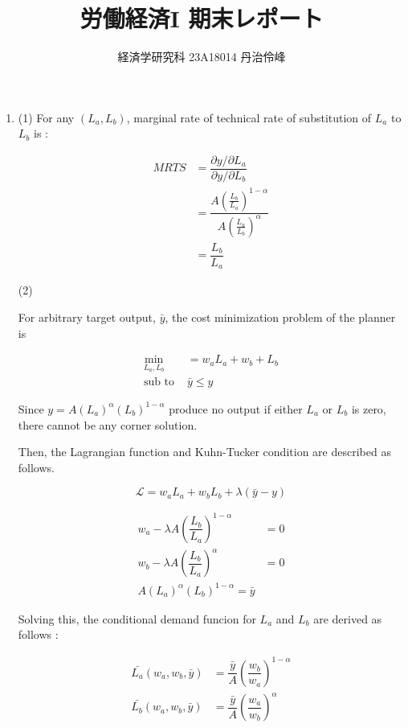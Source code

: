 \documentclass{jsarticle}
\begin{document}
\title{労働経済I 期末レポート}
\author{経済学研究科 23A18014 丹治伶峰}
\date{}
\maketitle

\large

 \begin{enumerate}
 
 \item
 
 (1)
  For any $(L_a, L_b)$, marginal rate of technical rate of substitution of $L_a$ to $L_b$ is :
 
  \begin{align*}
  \textit{MRTS} &= \dfrac{\partial y / \partial L_a}{\partial y / \partial L_b} \\
  &= \dfrac{A (\frac{L_b}{L_a})^{1-\alpha}}{A (\frac{L_a}{L_b})^\alpha} \\
  &= \dfrac{L_b}{L_a}
  \end{align*}
 
 (2)
 
 For arbitrary target output, $\bar{y}$, the cost minimization problem of the planner is
 
  \begin{align*}
  \min_{L_a, L_b} &= w_a L_a + w_b + L_b \\
  \text{sub to } & \bar{y} \leq y
  \end{align*}
 
 Since $y = A(L_a)^{\alpha} (L_b)^{1-\alpha}$ produce no output if either $L_a$ or $L_b$ is zero, there cannot be any corner solution.
 
 Then, the Lagrangian function and Kuhn-Tucker condition are described as follows.
 
 \[ \mathcal{L} = w_a L_a+ w_b L_b + \lambda(\bar{y} - y) \]
 
  \begin{align*}
  w_a - \lambda A \left( \dfrac{L_b}{L_a} \right)^{1-\alpha} &=0 \\
  w_b - \lambda A \left( \dfrac{L_b}{L_a} \right)^{\alpha} &=0 \\
  A (L_a)^{\alpha} (L_b)^{1- \alpha} = \bar{y}
  \end{align*}
 
 Solving this, the conditional demand funcion for $L_a$ and $L_b$ are derived as follows :
 
  \begin{align*}
  \bar{L_a}(w_a, w_b, \bar{y}) &
  = \dfrac{\bar{y}}{A} \left( \dfrac{w_b}{w_a} \right)^{1-\alpha} \\
  \bar{L_b}(w_a, w_b, \bar{y}) &
  = \dfrac{\bar{y}}{A} \left( \dfrac{w_a}{w_b} \right)^{\alpha}
  \end{align*}
 

\end{enumerate}
\end{document}
